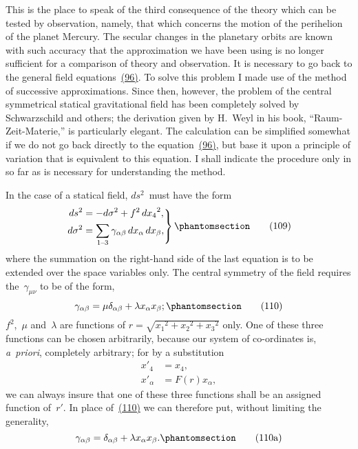 \documentclass[12pt]{book}[2005/09/16]
\newcommand{\Change}[2]{#2}
\newcommand{\Add}[1]{\Change{}{#1}}
\newcommand{\PageSep}[1]{\ignorespaces}
\newcommand{\Tag}[1]{%
  \phantomsection
  \label{eqn:#1}
  \tag*{#1}
}
\newcommand{\Eqref}[1]{\hyperref[eqn:#1]{#1}}
\begin{document}
This is the place to speak of the third consequence of
the theory which can be tested by observation, namely,
that which concerns the motion of the perihelion
of the planet Mercury. The secular changes in the
%
%
planetary orbits are known with such accuracy that the
approximation we have been using is no longer sufficient
for a comparison of theory and observation. It is necessary
to go back to the general field equations~\Eqref{(96)}. To
solve this problem I made use of the method of successive
approximations. Since then, however, the problem
of the central symmetrical statical gravitational field has
been completely solved by Schwarzschild and others;
the derivation given by H.~Weyl in his book, ``Raum-Zeit-Materie,''
%
is particularly elegant. The calculation
can be simplified somewhat if we do not go back directly
\PageSep{104}
to the equation~\Eqref{(96)}, but base it upon a principle of
variation that is equivalent to this equation. I shall
indicate the procedure only in so far as is necessary for
understanding the method.

In the case of a statical field, $ds^{2}$~must have the form
\[
\left.
\begin{aligned}
ds^{2} &= -d\sigma^{2} + f^{2}\, {dx_{4}}^{2}\Add{,} \\
d\sigma^{2}
   &= \sum_{\text{$1$--$3$}} \gamma_{\alpha\beta}\, dx_{\alpha}\, dx_{\beta}\Add{,}
\end{aligned}
\right\}
\Tag{(109)}
\]
where the summation on the right-hand side of the last
equation is to be extended over the space variables only\Change{,}{.}
The central symmetry of the field requires the~$\gamma_{\mu\nu}$ to be
of the form,
\[
\gamma_{\alpha\beta}
  = \mu \delta_{\alpha\beta} + \lambda x_{\alpha} x_{\beta}\Add{;}
\Tag{(110)}
\]
$f^{2}$,~$\mu$ and~$\lambda$ are functions of $r = \sqrt{{x_{1}}^{2} + {x_{2}}^{2} + {x_{3}}^{2}}$ only.
One of these three functions can be chosen arbitrarily,
because our system of co-ordinates is, \textit{a~priori}, completely
arbitrary; for by a substitution
\begin{align*}
{x'}_{4} &= x_{4}\Add{,} \\
{x'}_{\alpha} &= F(r) x_{\alpha}\Add{,}
\end{align*}
we can always insure that one of these three functions
shall be an assigned function of~$r'$. In place of~\Eqref{(110)} we
can therefore put, without limiting the generality,
\[
\gamma_{\alpha\beta}
  = \delta_{\alpha\beta} + \lambda x_{\alpha} x_{\beta}\Add{.}
\Tag{(110a)}
\]
\end{document}
